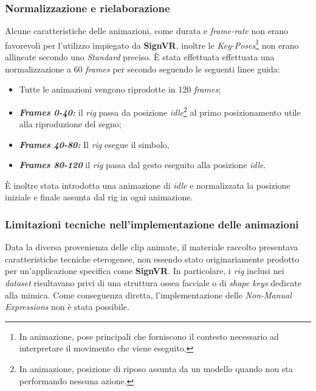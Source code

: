 \documentclass[12pt, a4paper]{article}
\begin{document}
        \subsubsection{Normalizzazione e rielaborazione}
        Alcune caratteristiche delle animazioni, come durata e \textit{frame-rate} 
        non erano favorevoli per l'utilizzo impiegato da \textbf{SignVR},
        inoltre le \textit{Key-Poses}\footnote{In animazione, pose principali che 
        forniscono il contesto necessario ad interpretare il movimento che viene eseguito.} 
        non erano allineate secondo uno \textit{Standard} preciso.
        È stata effettuata effettuata una normalizzazione a 60 \textit{frames} 
        per secondo seguendo le seguenti linee guida: 
        \label{regoleAnimazione}
        \begin{itemize}
            \item Tutte le animazioni vengono riprodotte in 120 \textit{frames};
            \item \textit{\textbf{Frames 0-40:}} il \textit{rig} passa da posizione 
            \textit{idle}\footnote{In animazione, posizione di riposo assunta da un modello 
            quando non sta performando nessuna azione.} al primo posizionamento utile alla 
            riproduzione del segno;
            \item \textit{\textbf{Frames 40-80:}} Il \textit{rig} esegue il simbolo,
            \item \textit{\textbf{Frames 80-120}} il \textit{rig} passa dal gesto eseguito 
            alla posizione \textit{idle}.
        \end{itemize}
        È inoltre stata introdotta una animazione di \textit{idle} e 
        normalizzata la posizione iniziale e finale assunta dal rig in ogni animazione.
        \subsubsection{Limitazioni tecniche nell'implementazione delle animazioni}
        \label{limitazionidataset}
        Data la diversa provenienza delle clip animate, il materiale raccolto 
        presentava caratteristiche tecniche eterogenee, non essendo stato originariamente 
        prodotto per un'applicazione specifica come \textbf{SignVR}. 
        In particolare, i \textit{rig} inclusi nei \textit{dataset} risultavano privi di 
        una struttura ossea facciale o di \textit{shape keys} dedicate alla mimica.
        Come conseguenza diretta, l'implementazione delle \textit{Non-Manual Expressions} 
        non è stata possibile.
\end{document}
